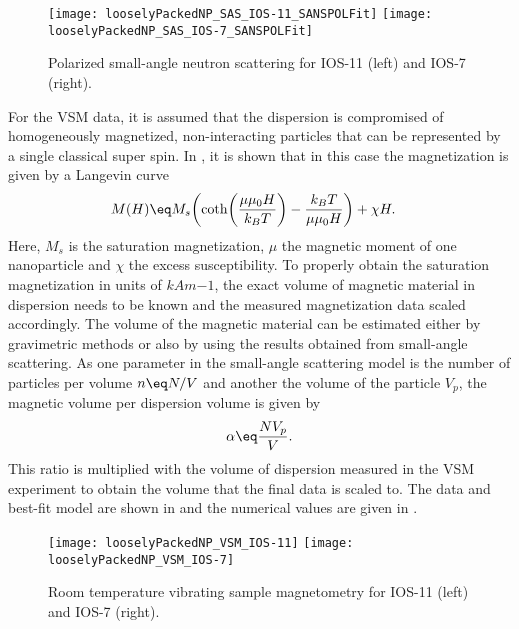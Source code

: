 \documentclass[\main/dresen_thesis.tex]{subfiles}
\begin{document}
    \begin{figure}[tb]
      \centering
      \texttt{[image: looselyPackedNP\_SAS\_IOS-11\_SANSPOLFit]}
      \texttt{[image: looselyPackedNP\_SAS\_IOS-7\_SANSPOLFit]}
      \caption{\label{fig:looselyPackedNP:nanoparticle:sanspol}Polarized small-angle neutron scattering for IOS-11 (left) and IOS-7 (right).}
    \end{figure}


    For the VSM data, it is assumed that the dispersion is compromised of homogeneously magnetized, non-interacting particles that can be represented by a single classical super spin.
    In , it is shown that in this case the magnetization is given by a Langevin curve
    \begin{align}
      M(H) \eq& M_s \biggl( \coth \biggl(\frac{\mu \mu_0 H}{k_B T} \biggr) - \frac{k_B T}{\mu \mu_0 H} \biggr) + \chi H.
    \end{align}
    Here, $M_s$ is the saturation magnetization, $\mu$ the magnetic moment of one nanoparticle and $\chi$ the excess susceptibility.
    To properly obtain the saturation magnetization in units of $\unit{kAm{-1}}$, the exact volume of magnetic material in dispersion needs to be known and the measured magnetization data scaled accordingly.
    The volume of the magnetic material can be estimated either by gravimetric methods or also by using the results obtained from small-angle scattering.
    As one parameter in the small-angle scattering model is the number of particles per volume $n \eq N/V$ and another the volume of the particle $V_p$, the magnetic volume per dispersion volume is given by
    \begin{align}
      \alpha \eq \frac{N V_p}{V}.
    \end{align}
    This ratio is multiplied with the volume of dispersion measured in the VSM experiment to obtain the volume that the final data is scaled to.
    The data and best-fit model are shown in  and the numerical values are given in .

    \begin{figure}[tb]
      \centering
      \texttt{[image: looselyPackedNP\_VSM\_IOS-11]}
      \texttt{[image: looselyPackedNP\_VSM\_IOS-7]}
      \caption{\label{fig:looselyPackedNP:nanoparticle:vsm}Room temperature vibrating sample magnetometry for IOS-11 (left) and IOS-7 (right).}
    \end{figure}
\end{document}
